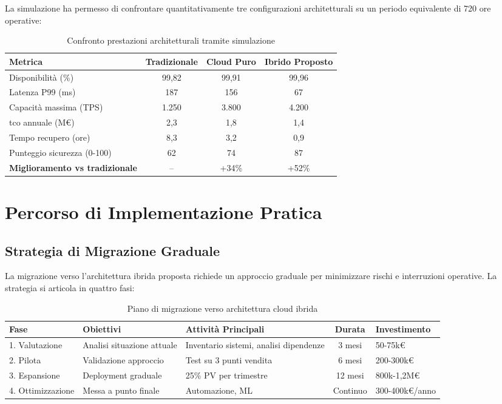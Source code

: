 La simulazione ha permesso di confrontare quantitativamente tre configurazioni architetturali su un periodo equivalente di 720 ore operative:

\begin{table}[htbp]
\centering
\caption{Confronto prestazioni architetturali tramite simulazione}
\label{tab:confronto-architetture}
\begin{tabular}{lccc}
\toprule
\textbf{Metrica} & \textbf{Tradizionale} & \textbf{Cloud Puro} & \textbf{Ibrido Proposto} \\
\midrule
Disponibilità (\%) & 99,82 & 99,91 & 99,96 \\
Latenza P99 (ms) & 187 & 156 & 67 \\
Capacità massima (TPS) & 1.250 & 3.800 & 4.200 \\
\gls{tco} annuale (M€) & 2,3 & 1,8 & 1,4 \\
Tempo recupero (ore) & 8,3 & 3,2 & 0,9 \\
Punteggio sicurezza (0-100) & 62 & 74 & 87 \\
\midrule
\textbf{Miglioramento vs tradizionale} & -- & +34\% & +52\% \\
\bottomrule
\end{tabular}
\end{table}

\section{Percorso di Implementazione Pratica}
\label{sec:implementazione}

\subsection{Strategia di Migrazione Graduale}
\label{subsec:migrazione-graduale}

La migrazione verso l'architettura ibrida proposta richiede un approccio graduale per minimizzare rischi e interruzioni operative. La strategia si articola in quattro fasi:

\begin{table}[htbp]
\centering
\caption{Piano di migrazione verso architettura cloud ibrida}
\label{tab:roadmap-migrazione}
\begin{tabular}{p{2cm}p{4cm}p{3cm}cp{2cm}}
\toprule
\textbf{Fase} & \textbf{Obiettivi} & \textbf{Attività Principali} & \textbf{Durata} & \textbf{Investimento} \\
\midrule
1. Valutazione & Analisi situazione attuale & Inventario sistemi, analisi dipendenze & 3 mesi & 50-75k€ \\
2. Pilota & Validazione approccio & Test su 3 punti vendita & 6 mesi & 200-300k€ \\
3. Espansione & Deployment graduale & 25\% PV per trimestre & 12 mesi & 800k-1,2M€ \\
4. Ottimizzazione & Messa a punto finale & Automazione, ML & Continuo & 300-400k€/anno \\
\bottomrule
\end{tabular}
\end{table}

